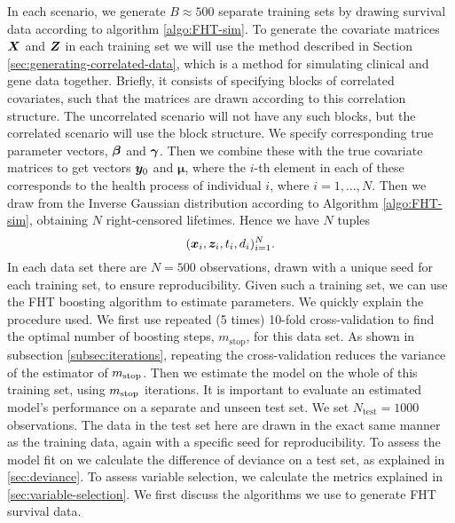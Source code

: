 In each scenario, we generate $B\approx500$ separate training sets by drawing survival data according to algorithm \ref{algo:FHT-sim}.
To generate the covariate matrices $\bm{X}$ and $\bm{Z}$ in each training set we will use the method described in Section \ref{sec:generating-correlated-data}, which is a method for simulating clinical and gene data together.
Briefly, it consists of specifying blocks of correlated covariates, such that the matrices are drawn according to this correlation structure.
The uncorrelated scenario will not have any such blocks, but the correlated scenario will use the block structure.
We specify corresponding true parameter vectors, $\boldsymbol{\beta}$ and $\boldsymbol{\gamma}$.
Then we combine these with the true covariate matrices to get vectors $\bm{y}_0$ and $\boldsymbol{\mu}$, where the $i$-th element in each of these corresponds to the health process of individual $i$, where $i=1,\ldots,N$.
Then we draw from the Inverse Gaussian distribution according to Algorithm \ref{algo:FHT-sim}, obtaining $N$ right-censored lifetimes.
Hence we have $N$ tuples 
\begin{equation*}
    (\bm{x}_i,\bm{z}_i,t_i,d_i)_{i=1}^{N}.
\end{equation*}
In each data set there are $N=500$ observations, drawn with a unique seed for each training set, to ensure reproducibility.
Given such a training set, we can use the FHT boosting algorithm to estimate parameters.
We quickly explain the procedure used.
We first use repeated (5 times) 10-fold cross-validation to find the optimal number of boosting steps, $m_{\text{stop}}$, for this data set.
As shown in subsection \ref{subsec:iterations}, repeating the cross-validation reduces the variance of the estimator of $m_{\text{stop}}$.
Then we estimate the model on the whole of this training set, using $m_{\text{stop}}$ iterations.
It is important to evaluate an estimated model's performance on a separate and unseen test set.
We set $N_{\text{test}}=1000$ observations.
The data in the test set here are drawn in the exact same manner as the training data, again with a specific seed for reproducibility.
To assess the model fit on we calculate the difference of deviance on a test set, as explained in \ref{sec:deviance}.
To assess variable selection, we calculate the metrics explained in \ref{sec:variable-selection}.
We first discuss the algorithms we use to generate FHT survival data.

